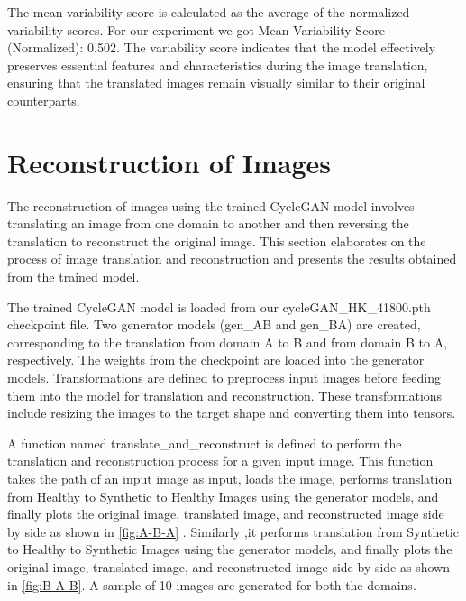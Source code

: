 \documentclass[UKenglish,12pt]{master-style}
\begin{document}
The mean variability score is calculated as the average of the normalized variability scores. For our experiment we got Mean Variability Score (Normalized): 0.502. The variability score indicates that the model effectively preserves essential features and characteristics during the image translation, ensuring that the translated images remain visually similar to their original counterparts.

\section{Reconstruction of Images}

The reconstruction of images using the trained CycleGAN model involves translating an image from one domain to another and then reversing the translation to reconstruct the original image. This section elaborates on the process of image translation and reconstruction and presents the results obtained from the trained model.

The trained CycleGAN model is loaded from our  cycleGAN\_HK\_41800.pth checkpoint file. Two generator models (gen\_AB and gen\_BA) are created, corresponding to the translation from domain A to B and from domain B to A, respectively. The weights from the checkpoint are loaded into the generator models. Transformations are defined to preprocess input images before feeding them into the model for translation and reconstruction. These transformations include resizing the images to the target shape and converting them into tensors.

A function named translate\_and\_reconstruct is defined to perform the translation and reconstruction process for a given input image. This function takes the path of an input image as input, loads the image, performs translation from Healthy to Synthetic to Healthy Images using the generator models, and finally plots the original image, translated image, and reconstructed image side by side as shown in \ref{fig:A-B-A} . Similarly ,it performs translation from Synthetic to Healthy to Synthetic Images using the generator models, and finally plots the original image, translated image, and reconstructed image side by side as shown in \ref{fig:B-A-B}. A sample of 10 images are generated for both the domains. 
\end{document}
